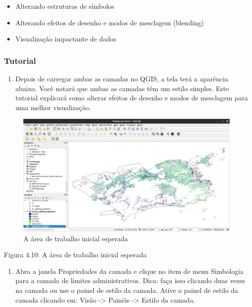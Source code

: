\documentclass[
]{book}
\providecommand{\tightlist}{%
  \setlength{\itemsep}{0pt}\setlength{\parskip}{0pt}}
\begin{document}
\begin{itemize}
\tightlist
\item
  Alterando estruturas de símbolos
\item
  Alterando efeitos de desenho e modos de mesclagem (blending)
\item
  Visualização impactante de dados
\end{itemize}

\hypertarget{tutorial}{%
\subsubsection{\texorpdfstring{\textbf{Tutorial}}{Tutorial}}\label{tutorial}}

\begin{enumerate}
\def\labelenumi{\arabic{enumi}.}
\tightlist
\item
  Depois de carregar ambas as camadas no QGIS, a tela terá a aparência abaixo. Você notará que ambas as camadas têm um estilo simples. Este tutorial explicará como alterar efeitos de desenho e modos de mesclagem para uma melhor visualização.
\end{enumerate}

\begin{figure}
\centering
\includegraphics{media/modulo4/initial-workspace.png}
\caption{A área de trabalho inicial esperada}
\end{figure}

Figura 4.10: A área de trabalho inicial esperada

\begin{enumerate}
\def\labelenumi{\arabic{enumi}.}
\setcounter{enumi}{1}
\tightlist
\item
  Abra a janela Propriedades da camada e clique no item de menu Simbologia para a camada de limites administrativos. Dica: faça isso clicando duas vezes na camada ou use o painel de estilo da camada. Ative o painel de estilo da camada clicando em: Visão -\textgreater{} Painéis -\textgreater{} Estilo da camada.
\end{enumerate}
\end{document}
